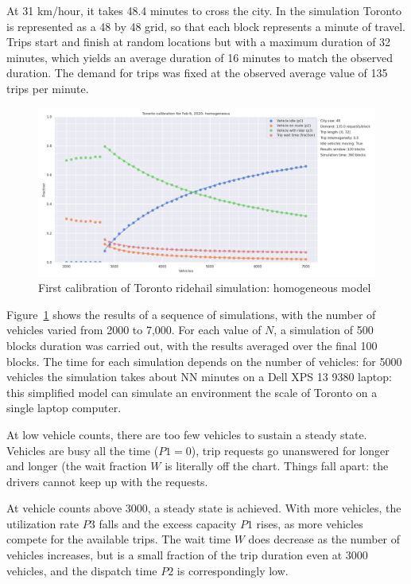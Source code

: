 \documentclass[
  letterpaper,
]{article}
\begin{document}
At 31 km/hour, it takes 48.4 minutes to cross the city. In the
simulation Toronto is represented as a 48 by 48 grid, so that each block
represents a minute of travel. Trips start and finish at random
locations but with a maximum duration of 32 minutes, which yields an
average duration of 16 minutes to match the observed duration. The
demand for trips was fixed at the observed average value of 135 trips
per minute.

\begin{figure}

{\centering \includegraphics{toronto_calibration_homogeneous.png}

}

\caption{\label{fig-toronto-homogeneous}First calibration of Toronto
ridehail simulation: homogeneous model}

\end{figure}

Figure~\ref{fig-toronto-homogeneous} shows the results of a sequence of
simulations, with the number of vehicles varied from 2000 to 7,000. For
each value of \(N\), a simulation of 500 blocks duration was carried
out, with the results averaged over the final 100 blocks. The time for
each simulation depends on the number of vehicles: for 5000 vehicles the
simulation takes about NN minutes on a Dell XPS 13 9380 laptop: this
simplified model can simulate an environment the scale of Toronto on a
single laptop computer.

At low vehicle counts, there are too few vehicles to sustain a steady
state. Vehicles are busy all the time (\(P1 = 0\)), trip requests go
unanswered for longer and longer (the wait fraction \(W\) is literally
off the chart. Things fall apart: the drivers cannot keep up with the
requests.

At vehicle counts above 3000, a steady state is achieved. With more
vehicles, the utilization rate \(P3\) falls and the excess capacity
\(P1\) rises, as more vehicles compete for the available trips. The wait
time \(W\) does decrease as the number of vehicles increases, but is a
small fraction of the trip duration even at 3000 vehicles, and the
dispatch time \(P2\) is correspondingly low.
\end{document}
